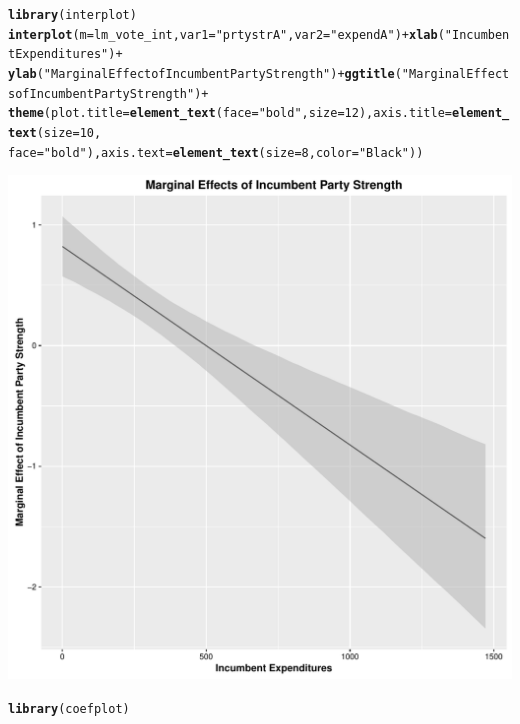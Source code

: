 \documentclass[12pt]{article}\usepackage[]{graphicx}\usepackage[]{color}
\makeatletter
\def\maxwidth{ %
  \ifdim\Gin@nat@width>\linewidth
    \linewidth
  \else
    \Gin@nat@width
  \fi
}
\newcommand{\hlnum}[1]{\textcolor[rgb]{0.686,0.059,0.569}{#1}}%
\newcommand{\hlstr}[1]{\textcolor[rgb]{0.192,0.494,0.8}{#1}}%
\newcommand{\hlopt}[1]{\textcolor[rgb]{0,0,0}{#1}}%
\newcommand{\hlstd}[1]{\textcolor[rgb]{0.345,0.345,0.345}{#1}}%
\newcommand{\hlkwc}[1]{\textcolor[rgb]{0.333,0.667,0.333}{#1}}%
\newcommand{\hlkwd}[1]{\textcolor[rgb]{0.737,0.353,0.396}{\textbf{#1}}}%
\newenvironment{kframe}{%
 \def\at@end@of@kframe{}%
 \ifinner\ifhmode%
  \def\at@end@of@kframe{\end{minipage}}%
  \begin{minipage}{\columnwidth}%
 \fi\fi%
 \def\FrameCommand##1{\hskip\@totalleftmargin \hskip-\fboxsep
 \colorbox{shadecolor}{##1}\hskip-\fboxsep
     \hskip-\linewidth \hskip-\@totalleftmargin \hskip\columnwidth}%
 \MakeFramed {\advance\hsize-\width
   \@totalleftmargin\z@ \linewidth\hsize
   \@setminipage}}%
 {\par\unskip\endMakeFramed%
 \at@end@of@kframe}
\newenvironment{knitrout}{}{} %
\makeatother
\begin{document}
\begin{knitrout}
\begin{kframe}
\begin{alltt}
\hlkwd{library}\hlstd{(interplot)}
\hlkwd{interplot}\hlstd{(}\hlkwc{m} \hlstd{= lm_vote_int,} \hlkwc{var1} \hlstd{=} \hlstr{"prtystrA"}\hlstd{,} \hlkwc{var2} \hlstd{=} \hlstr{"expendA"}\hlstd{)} \hlopt{+} \hlkwd{xlab}\hlstd{(}\hlstr{"Incumbent Expenditures"}\hlstd{)} \hlopt{+}
    \hlkwd{ylab}\hlstd{(}\hlstr{"Marginal Effect of Incumbent Party Strength"}\hlstd{)} \hlopt{+} \hlkwd{ggtitle}\hlstd{(}\hlstr{"Marginal Effects of Incumbent Party Strength"}\hlstd{)} \hlopt{+}
    \hlkwd{theme}\hlstd{(}\hlkwc{plot.title} \hlstd{=} \hlkwd{element_text}\hlstd{(}\hlkwc{face} \hlstd{=} \hlstr{"bold"}\hlstd{,} \hlkwc{size} \hlstd{=} \hlnum{12}\hlstd{),} \hlkwc{axis.title} \hlstd{=} \hlkwd{element_text}\hlstd{(}\hlkwc{size} \hlstd{=} \hlnum{10}\hlstd{,}
        \hlkwc{face} \hlstd{=} \hlstr{"bold"}\hlstd{),} \hlkwc{axis.text} \hlstd{=} \hlkwd{element_text}\hlstd{(}\hlkwc{size} \hlstd{=} \hlnum{8}\hlstd{,} \hlkwc{color} \hlstd{=} \hlstr{"Black"}\hlstd{))}
\end{alltt}
\end{kframe}
\includegraphics[width=\maxwidth]{figure/unnamed-chunk-3-2} 
\begin{kframe}\begin{alltt}
\hlkwd{library}\hlstd{(coefplot)}
\end{alltt}


{\ttfamily\noindent\itshape\color{messagecolor}{\#\# \\\#\# Attaching package: 'coefplot'}}


\end{kframe}
\end{knitrout}
\end{document}
